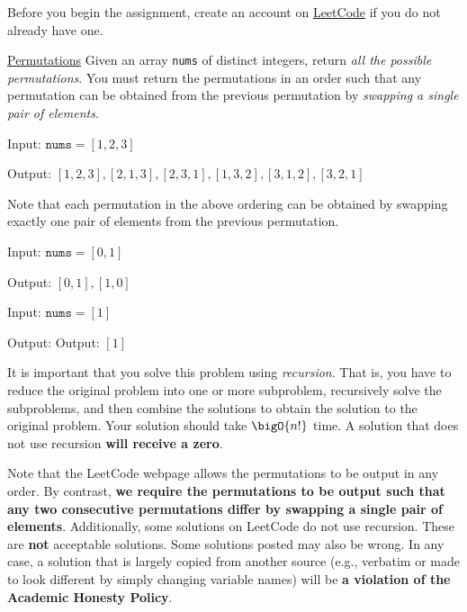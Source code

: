 \documentclass[draft]{article}
\begin{document}
\begin{titlepage}
    Before you begin the assignment, create an account on \href{https://leetcode.com/}{LeetCode} if you do not already have one.

    \begin{problem}{\href{https://leetcode.com/problems/permutations/}{Permutations}}{}
    Given an array \texttt{nums} of distinct integers, return \emph{all the possible permutations}. You must return the permutations in an order such that any permutation can be obtained from the previous permutation  by \emph{swapping a single pair of elements}.
    \end{problem}

    \begin{example}{}{}
        Input: $\texttt{nums} = [1,2,3]$

        Output: \noindent $[1, 2, 3], [2, 1, 3], [2, 3, 1], [1, 3, 2], [3, 1, 2], [3, 2, 1]$

        Note that each permutation in the above ordering can be obtained by swapping exactly one pair of elements from the previous permutation.

    \end{example}

    \begin{example}{}{}
        Input: $\texttt{nums} = [0,1]$

        Output: \noindent $[0, 1], [1, 0]$
    \end{example}

    \begin{example}{}{}
        Input: $\texttt{nums} = [1]$

        Output: \noindent Output: $[1]$
    \end{example}

    It is important that you solve this problem using \emph{recursion}. That is, you have to reduce the original problem into one or more subproblem, recursively solve the subproblems, and then combine the solutions to obtain the solution to the original problem. Your solution should take $\bigO{n!}$ time. A solution that does not use recursion \textbf{will receive a zero}.

    Note that the LeetCode webpage allows the permutations to be output in any order. By contrast, \textbf{we require the permutations to be output such that any two consecutive permutations differ by swapping a single pair of elements}. Additionally, some solutions on LeetCode do not use recursion. These are \textbf{not} acceptable solutions. Some solutions posted may also be wrong. In any case,
    a solution that is largely copied from another source (e.g., verbatim or made to look different by simply changing variable names) will be \textbf{a violation of the Academic Honesty Policy}.


\end{titlepage}
\end{document}

